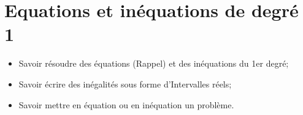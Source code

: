 \chapter{Equations et inéquations de degré 1}\label{ChDegre1}

\begin{acquis}
\begin{itemize}
\item Savoir résoudre des équations (Rappel) et des inéquations du 1er degré;
\item Savoir écrire des inégalités sous forme d'Intervalles réels;
\item Savoir mettre en équation ou en inéquation un problème.
\end{itemize}
\end{acquis}
\exercicesbase
\begin{colonne*exercice}

\end{colonne*exercice}


\connaissances




\pagebreak




